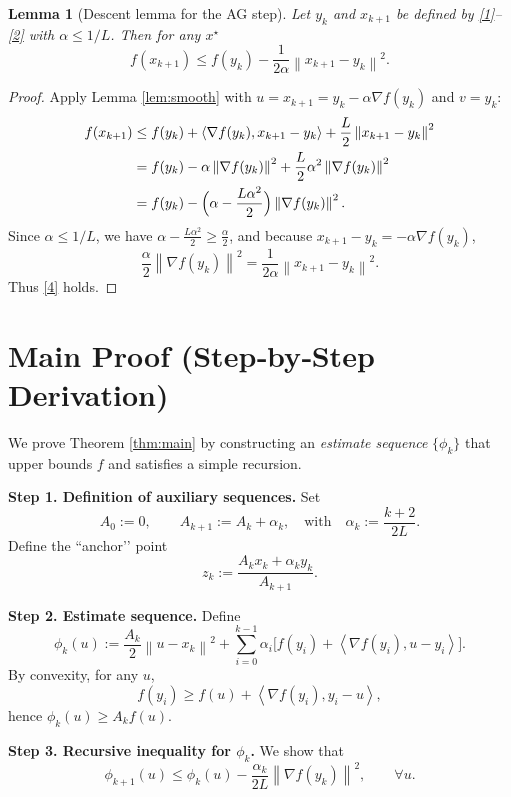 \documentclass{article}
\newtheorem{lemma}{Lemma}
\newcommand{\grad}{\nabla}
\newcommand{\norm}[1]{\left\lVert#1\right\rVert}
\newcommand{\inner}[2]{\left\langle #1,#2\right\rangle}
\begin{document}
\begin{lemma}[Descent lemma for the AG step]\label{lem:descent}
Let $y_k$ and $x_{k+1}$ be defined by \eqref{1}–\eqref{2} with $\alpha\le1/L$.
Then for any $x^\star$
\[
f(x_{k+1})\le f(y_k)-\frac{1}{2\alpha}\norm{x_{k+1}-y_k}^{2}.
\tag{4}
\]
\end{lemma}
\begin{proof}
Apply Lemma \ref{lem:smooth} with $u=x_{k+1}=y_k-\alpha\grad f(y_k)$ and $v=y_k$:
\[
\begin{aligned}
f(x_{k+1})
&\le f(y_k)+\inner{\grad f(y_k)}{x_{k+1}-y_k}
   +\frac{L}{2}\norm{x_{k+1}-y_k}^{2}\\
&= f(y_k)-\alpha\norm{\grad f(y_k)}^{2}
   +\frac{L}{2}\alpha^{2}\norm{\grad f(y_k)}^{2}\\
&= f(y_k)-\Bigl(\alpha-\frac{L\alpha^{2}}{2}\Bigr)\norm{\grad f(y_k)}^{2}.
\end{aligned}
\]
Since $\alpha\le1/L$, we have $\alpha-\frac{L\alpha^{2}}{2}\ge\frac{\alpha}{2}$,
and because $x_{k+1}-y_k=-\alpha\grad f(y_k)$,
\[
\frac{\alpha}{2}\norm{\grad f(y_k)}^{2}
   =\frac{1}{2\alpha}\norm{x_{k+1}-y_k}^{2}.
\]
Thus \eqref{4} holds. \qedhere
\end{proof}

\section*{Main Proof (Step‑by‑Step Derivation)}
We prove Theorem \ref{thm:main} by constructing an {\em estimate sequence}
$\{\phi_k\}$ that upper bounds $f$ and satisfies a simple recursion.

\noindent\textbf{Step 1. Definition of auxiliary sequences.}  
Set 
\[
A_0:=0,\qquad
A_{k+1}:=A_k+\alpha_k,\quad\text{with}\quad\alpha_k:=\frac{k+2}{2L}.
\tag{5}
\]
Define the “anchor’’ point
\[
z_k:=\frac{A_k x_k +\alpha_k y_k}{A_{k+1}}.
\tag{6}
\]

\noindent\textbf{Step 2. Estimate sequence.}  
Define 
\[
\phi_k(u):= \frac{A_k}{2}\norm{u-x_k}^{2}+ \sum_{i=0}^{k-1}\alpha_i\bigl[f(y_i)+\inner{\grad f(y_i)}{u-y_i}\bigr].
\tag{7}
\]
By convexity, for any $u$,
\[
f(y_i)\ge f(u)+\inner{\grad f(y_i)}{y_i-u},
\]
hence $\phi_k(u)\ge A_k f(u)$.  

\noindent\textbf{Step 3. Recursive inequality for $\phi_k$.}  
We show that
\[
\phi_{k+1}(u)\le\phi_k(u)-\frac{\alpha_k}{2L}\norm{\grad f(y_k)}^{2},\qquad\forall u.
\tag{8}
\]
\end{document}
